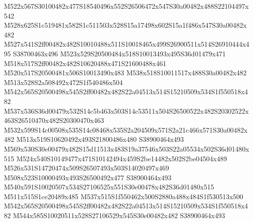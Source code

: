 \documentclass{article}
\begin{document}
\begin{multicols}{2}
M522x567S30100482x477S18540496x552S26506472x547S30a00482x488S22104497x542 M528x625S1c519481x582S1c511503x528S15a17498x602S15a1f486x547S30a00482x482 M527x541S2ff00482x482S10010488x511S10018465x499S26900511x514S26910444x495 S38700463x496 M523x529S20500484x518S10013493x495S36d01479x471 M518x517S2ff00482x482S10620488x471S21600488x461 M520x517S20500481x506S10013490x483 M538x518S10011517x488S30a00482x482 M513x528S2a508492x472S1f540486x504 M542x565S20500498x545S2ff00482x482S22a04513x514S15210509x534S1f550518x482 M537x536S36d00479x532S14c5b463x503S14c53511x504S26500522x482S20302522x463S26510470x482S20300470x463 M532x599S14c00508x535S14c08468x535S2a204509x571S2a21c466x571S30a00482x482 M513x519S10620492x493S21800486x480 S38900464x493 M569x530S30e00479x482S15d11513x483S19a37546x503S22a05534x502S36d01480x515 M524x540S10149477x471S10142494x459S2be14482x502S2be04504x489 M526x531S14720474x509S26507493x503S14020497x469 M508x523S10000493x493S26500492x477 S38900464x493 M540x591S10020507x534S27106525x551S30e00478x482S36d01480x515 M511x515S1ce20489x485 M537x515S1f550462x500S2880a488x484S1f530513x500 M542x565S20500498x545S2ff00482x482S22a04513x514S15210509x534S1f550518x482 M544x585S10020511x528S27106529x545S30e00482x482 S38900464x493










\end{multicols}
\end{document}

